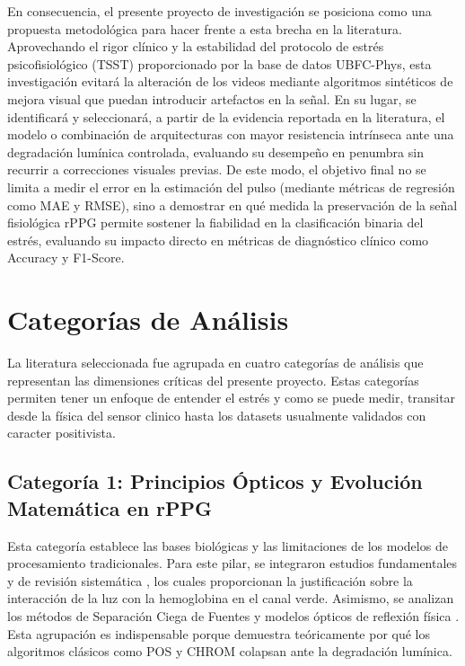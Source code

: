 En consecuencia, el presente proyecto de investigación se posiciona como una propuesta 
metodológica para hacer frente a esta brecha en la literatura. Aprovechando el rigor 
clínico y la estabilidad del protocolo de estrés psicofisiológico (TSST) proporcionado 
por la base de datos UBFC-Phys, esta investigación evitará la alteración de los videos 
mediante algoritmos sintéticos de mejora visual que puedan introducir artefactos en la 
señal. En su lugar, se identificará y seleccionará, a partir de la evidencia reportada en 
la literatura, el modelo o combinación de arquitecturas con mayor resistencia intrínseca 
ante una degradación lumínica controlada, evaluando su desempeño en penumbra sin recurrir 
a correcciones visuales previas. De este modo, el objetivo final no se limita a medir el 
error en la estimación del pulso (mediante métricas de regresión como MAE y RMSE), sino a 
demostrar en qué medida la preservación de la señal fisiológica rPPG permite sostener la 
fiabilidad en la clasificación binaria del estrés, evaluando su impacto directo en métricas 
de diagnóstico clínico como Accuracy y F1-Score.




\section{Categorías de Análisis}

La literatura seleccionada fue agrupada en cuatro categorías de análisis que representan las dimensiones críticas del presente proyecto. Estas categorías 
permiten tener un enfoque de entender el estrés y como se puede medir, transitar desde la física del sensor clinico hasta los datasets usualmente validados con caracter positivista.

\subsection{Categoría 1: Principios Ópticos y Evolución Matemática en rPPG}
Esta categoría establece las bases biológicas y las limitaciones de los modelos de procesamiento tradicionales. Para este pilar, se integraron estudios 
fundamentales y de revisión sistemática \cite{yang2022assessment_dl, camerabased2024wang}, los cuales proporcionan la justificación sobre la interacción de la 
luz con la hemoglobina en el canal verde. Asimismo, se analizan los métodos de Separación Ciega de Fuentes y modelos ópticos de reflexión física 
\cite{transphys2023, yang2022assessment_dl, yue2024facial_peak}. Esta agrupación es indispensable porque demuestra teóricamente por qué los algoritmos clásicos 
como POS y CHROM colapsan ante la degradación lumínica.

